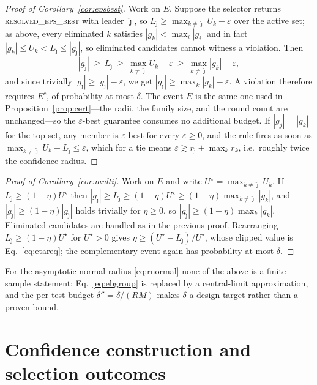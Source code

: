 \documentclass[aps,pra,reprint,superscriptaddress,nofootinbib,floatfix]{revtex4-2}
\begin{document}
\begin{proof}[Proof of Corollary~\ref{cor:epsbest}]
Work on $E$. Suppose the selector returns \textsc{resolved\_eps\_best} with leader $\hat\jmath$, so $L_{\hat\jmath}\ge\max_{k\neq\hat\jmath}U_k-\varepsilon$ over the active set; as above, every eliminated $k$ satisfies $|g_k|<\max_i|g_i|$ and in fact $|g_k|\le U_k<L_{\hat\jmath}\le|g_{\hat\jmath}|$, so eliminated candidates cannot witness a violation. Then
\begin{equation*}
|g_{\hat\jmath}|\ \ge\ L_{\hat\jmath}\ \ge\ \max_{k\neq\hat\jmath}U_k-\varepsilon\ \ge\ \max_{k\neq\hat\jmath}|g_k|-\varepsilon ,
\end{equation*}
and since trivially $|g_{\hat\jmath}|\ge|g_{\hat\jmath}|-\varepsilon$, we get $|g_{\hat\jmath}|\ge\max_k|g_k|-\varepsilon$. A violation therefore requires $E^c$, of probability at most $\delta$. The event $E$ is the same one used in Proposition~\ref{prop:cert}---the radii, the family size, and the round count are unchanged---so the $\varepsilon$-best guarantee consumes no additional budget. If $|g_j|=|g_k|$ for the top set, any member is $\varepsilon$-best for every $\varepsilon\ge0$, and the rule fires as soon as $\max_{k\neq\hat\jmath}U_k-L_{\hat\jmath}\le\varepsilon$, which for a tie means $\varepsilon\gtrsim r_{\hat\jmath}+\max_k r_k$, i.e.\ roughly twice the confidence radius.
\end{proof}

\begin{proof}[Proof of Corollary~\ref{cor:multi}]
Work on $E$ and write $U^\star=\max_{k\neq\hat\jmath}U_k$. If $L_{\hat\jmath}\ge(1-\eta)U^\star$ then $|g_{\hat\jmath}|\ge L_{\hat\jmath}\ge(1-\eta)U^\star\ge(1-\eta)\max_{k\neq\hat\jmath}|g_k|$, and $|g_{\hat\jmath}|\ge(1-\eta)|g_{\hat\jmath}|$ holds trivially for $\eta\ge0$, so $|g_{\hat\jmath}|\ge(1-\eta)\max_k|g_k|$. Eliminated candidates are handled as in the previous proof. Rearranging $L_{\hat\jmath}\ge(1-\eta)U^\star$ for $U^\star>0$ gives $\eta\ge(U^\star-L_{\hat\jmath})/U^\star$, whose clipped value is Eq.~\eqref{eq:etareq}; the complementary event again has probability at most $\delta$.
\end{proof}

For the asymptotic normal radius \eqref{eq:rnormal} none of the above is a finite-sample statement: Eq.~\eqref{eq:ebgroup} is replaced by a central-limit approximation, and the per-test budget $\delta''=\delta/(RM)$ makes $\delta$ a design target rather than a proven bound.

\section{Confidence construction and selection outcomes}
\label{app:confidence}
\end{document}
